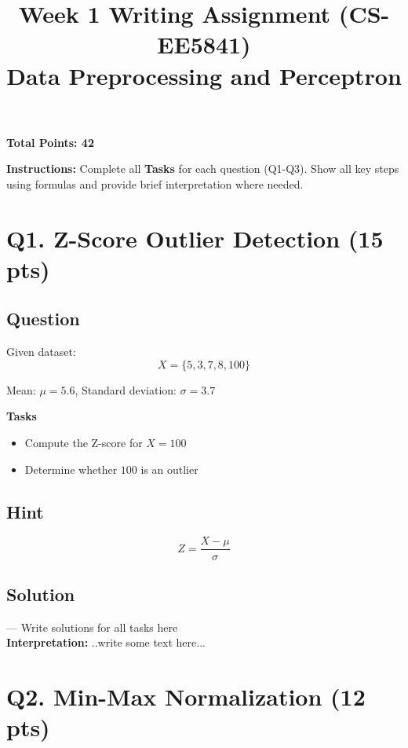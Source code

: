 \documentclass[11pt]{article}
\title{\textbf{Week 1 Writing Assignment (CS-EE5841)}\\Data Preprocessing and Perceptron}
\date{}
\begin{document}
\maketitle

\noindent \textbf{Total Points: 42}

\vspace{0.3cm}

\noindent \textbf{Instructions:} Complete all \textbf{Tasks} for each question (Q1-Q3). Show all key steps using formulas and provide brief interpretation where needed.

\section*{Q1. Z-Score Outlier Detection (15 pts)}

\subsection*{Question}

Given dataset:
\[
X = \{5, 3, 7, 8, 100\}
\]

Mean: $\mu = 5.6$, Standard deviation: $\sigma = 3.7$

\textbf{Tasks}
\begin{itemize}
    \item Compute the Z-score for $X = 100$
    \item Determine whether $100$ is an outlier
\end{itemize}

\subsection*{Hint}

\[
Z = \frac{X - \mu}{\sigma}
\]

\subsection*{Solution}

--- Write solutions for all tasks here \\

\textbf{Interpretation:} ..write some text here...

\section*{Q2. Min-Max Normalization (12 pts)}
\end{document}
